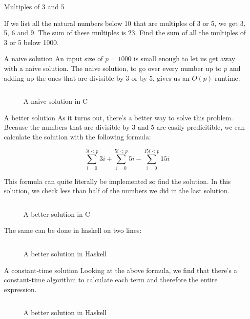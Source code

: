 \documentclass[main.tex]{subfiles}
\begin{document}
\begin{prob}{1}{Multiples of 3 and 5}
  \begin{problem}
    If we list all the natural numbers below 10 that are multiples of 3 or 5, we get 3, 5, 6 and 9. The sum of these multiples is 23.
    Find the sum of all the multiples of 3 or 5 below 1000.
  \end{problem}
  \begin{solutions}
    \begin{solution}{A naive solution}
      An input size of $p=1000$ is small enough to let us get away with a naive solution.
      The naive solution, to go over every number up to $p$ and adding up the ones that are divisible by $3$ or by $5$, gives us an $O(p)$ runtime.

      \begin{figure}[H]
        \centering
        \inputminted[firstline=14, lastline=24]{c}{\sol{001}{c}/naive.c}
        \caption{A naive solution in C}
      \end{figure}
    \end{solution}

    \begin{solution}{A better solution}
      As it turns out, there's a better way to solve this problem.
      Because the numbers that are divisible by $3$ and $5$ are easily predicitible, we can calculate the solution with the following formula:

      \[
        \sum_{i=0}^{3i < p}3i
        + \sum_{i=0}^{5i < p}5i
        - \sum_{i=0}^{15i < p}15i
      \]

      This formula can quite literally be implemented so find the solution.
      In this solution, we check less than half of the numbers we did in the last solution.

      \begin{figure}[H]
        \centering
        \inputminted[firstline=15, lastline=28]{c}{\sol{001}{c}/better.c}
        \caption{A better solution in C}
      \end{figure}

      The same can be done in haskell on two lines:
      \begin{figure}[H]
        \centering
        \inputminted[firstline=7, lastline=10]{haskell}{\sol{001}{haskell}/better.hs}
        \caption{A better solution in Haskell}
      \end{figure}
    \end{solution}

    \begin{solution}{A constant-time solution}
      Looking at the above formula, we find that there's a constant-time algorithm to calculate each term and therefore the entire expression.
      \begin{figure}[H]
        \centering
        \inputminted[firstline=16, lastline=20]{c}{\sol{001}{c}/solution.c}
        \caption{A better solution in Haskell}
      \end{figure}
    \end{solution}
  \end{solutions}
\end{prob}
\end{document}
